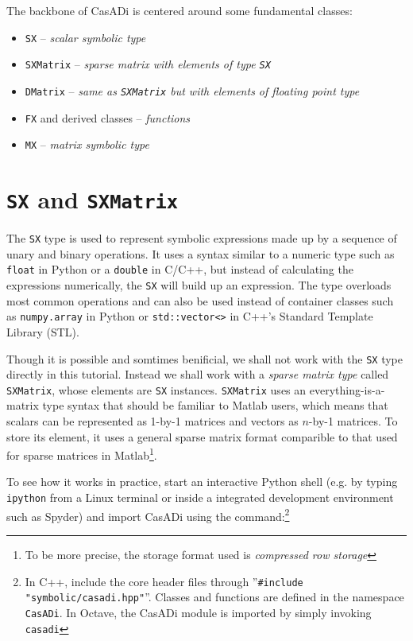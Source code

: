 \documentclass[a4paper,12pt]{book}
\begin{document}
{The backbone of CasADi is centered around some fundamental classes:
\begin{itemize}
 \item \texttt{SX} -- \emph{scalar symbolic type}
 \item \texttt{SXMatrix} -- \emph{sparse matrix with elements of type \texttt{SX}}
 \item \texttt{DMatrix}  -- \emph{same as \texttt{SXMatrix} but with elements of floating point type}
 \item \texttt{FX} and derived classes -- \emph{functions}
 \item \texttt{MX} -- \emph{matrix symbolic type}
\end{itemize}

\section{\texttt{SX} and \texttt{SXMatrix}}
The \texttt{SX} type is used to represent symbolic expressions made up by a sequence of unary and binary operations. It uses a syntax similar to a numeric type such as \texttt{float} in Python or a \texttt{double} in C/C++, but instead of calculating the expressions numerically, the \texttt{SX} will build up an expression. The type overloads most common operations and can also be used instead of container classes such as \texttt{numpy.array} in Python or \texttt{std::vector<>} in C++'s Standard Template Library (STL).

Though it is possible and somtimes benificial, we shall not work with the \texttt{SX} type directly in this tutorial. Instead we shall work with a \emph{sparse matrix type} called \texttt{SXMatrix}, whose elements are \texttt{SX} instances. \texttt{SXMatrix} uses an everything-is-a-matrix type syntax that should be familiar to Matlab users, which means that scalars can be represented as 1-by-1 matrices and vectors as $n$-by-1 matrices. To store its element, it uses a general sparse matrix format comparible to that used for sparse matrices in Matlab\footnote{To be more precise, the storage format used is \emph{compressed row storage}}.

To see how it works in practice, start an interactive Python shell (e.g. by typing \texttt{ipython} from a Linux terminal or inside a integrated development environment such as Spyder) and import CasADi using the command:\footnote{In C++, include the core header files through ''\texttt{\#include "symbolic/casadi.hpp"}''. Classes and functions are defined in the namespace \texttt{CasADi}. In Octave, the CasADi module is imported by simply invoking \texttt{casadi}}

}
\end{document}
